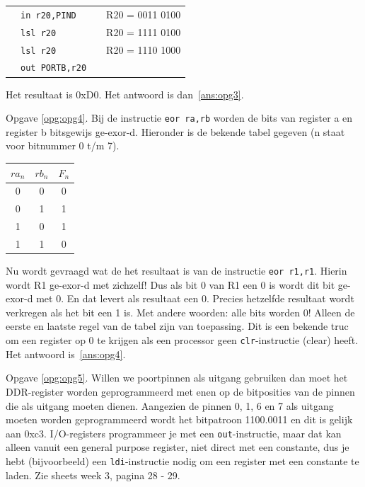 \documentclass[a4paper,12pt,fleqn,dutch]{tisdexam}
\begin{document}
\begin{questions}
\begin{table}[h!]
	\begin{tabular}{l l l l}
		 & \texttt{in  r20,PIND}   &  &  R20 = 0011 0100  \\ 
	 	 & \texttt{lsl r20}        &  &  R20 = 1111 0100  \\ 
		 & \texttt{lsl r20}        &  &  R20 = 1110 1000  \\ 
		 & \texttt{out PORTB,r20}  &  &   \\
	\end{tabular} 
\end{table}

Het resultaat is 0xD0. Het antwoord is dan~\ref{ans:opg3}.

\vspace{1em}
Opgave \ref{opg:opg4}. Bij  de instructie \texttt{eor ra,rb} worden de bits van
register a en register b bitsgewijs ge-exor-d. Hieronder is de bekende tabel
gegeven (n staat voor bitnummer 0 t/m 7).

\begin{table}[h!]
	\begin{tabular}{c c | c}
		\hline
		 $ra_{n}$ & $rb_{n}$ &  $F_{n}$  \\ \hline
		    0     &    0     &    0      \\ 
		    0     &    1     &    1      \\
		    1     &    0     &    1      \\
		    1     &    1     &    0      \\ \hline
	\end{tabular} 
\end{table}
			
Nu wordt gevraagd wat de het resultaat is van de instructie \texttt{eor r1,r1}.
Hierin wordt R1 ge-exor-d met zichzelf! Dus als bit 0 van R1 een 0 is wordt dit
bit ge-exor-d met 0. En dat levert als resultaat een 0. Precies hetzelfde
resultaat wordt verkregen als het bit een 1 is. Met andere woorden: alle bits
worden 0! Alleen de eerste en laatste regel van de tabel zijn van toepassing.
Dit is een bekende truc om een register op 0 te krijgen als een processor geen
\texttt{clr}-instructie (clear) heeft. Het antwoord is~\ref{ans:opg4}.

\vspace{1em}
Opgave \ref{opg:opg5}. Willen we poortpinnen als uitgang gebruiken dan moet het DDR-register worden
geprogrammeerd met enen op de bitposities van de pinnen die als uitgang moeten
dienen. Aangezien de pinnen 0, 1, 6 en 7 als uitgang moeten worden
geprogrammeerd wordt het bitpatroon 1100.0011 en dit is gelijk aan 0xc3.
I/O-registers programmeer je met een \texttt{out}-instructie, maar dat kan alleen
vanuit een general purpose register, niet direct met een constante, dus je hebt
(bijvoorbeeld) een \texttt{ldi}-instructie nodig om een register met een
constante te laden. Zie sheets week 3, pagina 28 - 29.


\end{questions}
\end{document}
